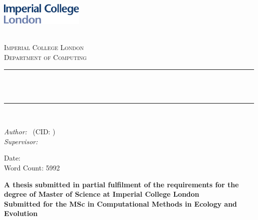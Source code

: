 \begin{titlepage}

\newcommand{\HRule}{\rule{\linewidth}{0.5mm}} %



\includegraphics[width = 4cm]{./figures/imperial}\\[0.5cm] 

\begin{center} %

\textsc{\LARGE \reporttype}\\[1.5cm] 
\textsc{\Large Imperial College London}\\[0.5cm] 
\textsc{\large Department of Computing}\\[0.5cm] 

\HRule \\[0.4cm]
{ \huge \bfseries \reporttitle}\\ %
\HRule \\[1.5cm]
\end{center}

\begin{flushleft} \large
\textit{Author:}
\reportauthor~(CID: \cid) %
\\
\textit{Supervisor:}
\reportsupervisor~
\end{flushleft}
\vspace{2cm}
\makeatletter
Date: \@date \\
Word Count: 5992
\vfill %
\begin{center}
\textbf{A thesis submitted in partial fulfilment of the requirements for the degree of Master of Science at Imperial College London}\\
\textbf{Submitted for the MSc in Computational Methods in Ecology and Evolution}
\end{center}

\makeatother


\end{titlepage}

